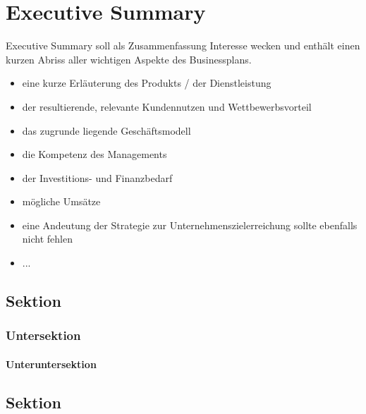 \chapter{Executive Summary}

Executive Summary soll als Zusammenfassung Interesse wecken und enthält einen kurzen Abriss aller wichtigen Aspekte des Businessplans.
\begin{itemize}
\item eine kurze Erläuterung des Produkts / der Dienstleistung
\item der resultierende, relevante Kundennutzen und Wettbewerbsvorteil
\item das zugrunde liegende Geschäftsmodell
\item die Kompetenz des Managements
\item der Investitions- und Finanzbedarf
\item mögliche Umsätze
\item eine Andeutung der Strategie zur Unternehmenszielerreichung sollte ebenfalls nicht fehlen
\item ...
\end{itemize}

\section{Sektion}

\blindtext

\subsection{Untersektion}

\subsubsection{Unteruntersektion}

\section{Sektion}